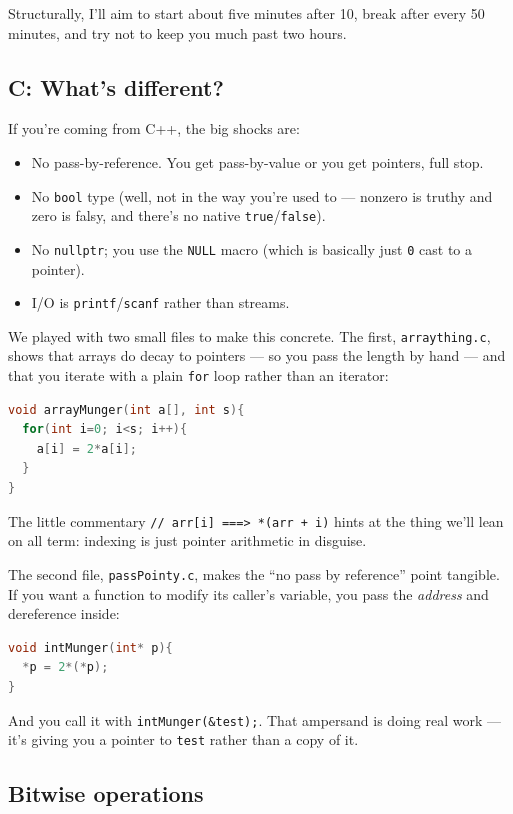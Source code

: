 \documentclass[11pt]{article}
\begin{document}
Structurally, I'll aim to start about five minutes after 10, break
after every 50 minutes, and try not to keep you much past two hours.

\subsection*{C: What's different?}

If you're coming from C++, the big shocks are:
\begin{itemize}
  \item No pass-by-reference. You get pass-by-value or you get
    pointers, full stop.
  \item No \texttt{bool} type (well, not in the way you're used to ---
    nonzero is truthy and zero is falsy, and there's no native
    \texttt{true}/\texttt{false}).
  \item No \texttt{nullptr}; you use the \texttt{NULL} macro (which is
    basically just \texttt{0} cast to a pointer).
  \item I/O is \texttt{printf}/\texttt{scanf} rather than streams.
\end{itemize}

We played with two small files to make this concrete. The first,
\texttt{arraything.c}, shows that arrays do decay to pointers --- so
you pass the length by hand --- and that you iterate with a plain
\texttt{for} loop rather than an iterator:

\begin{lstlisting}[language=C]
void arrayMunger(int a[], int s){
  for(int i=0; i<s; i++){
    a[i] = 2*a[i];
  }
}
\end{lstlisting}

The little commentary \texttt{// arr[i] ===> *(arr + i)} hints at the
thing we'll lean on all term: indexing is just pointer arithmetic in
disguise.

The second file, \texttt{passPointy.c}, makes the ``no pass by
reference'' point tangible. If you want a function to modify its
caller's variable, you pass the \emph{address} and dereference inside:

\begin{lstlisting}[language=C]
void intMunger(int* p){
  *p = 2*(*p);
}
\end{lstlisting}

And you call it with \texttt{intMunger(\&test);}. That ampersand is
doing real work --- it's giving you a pointer to \texttt{test} rather
than a copy of it.

\subsection*{Bitwise operations}
\end{document}
